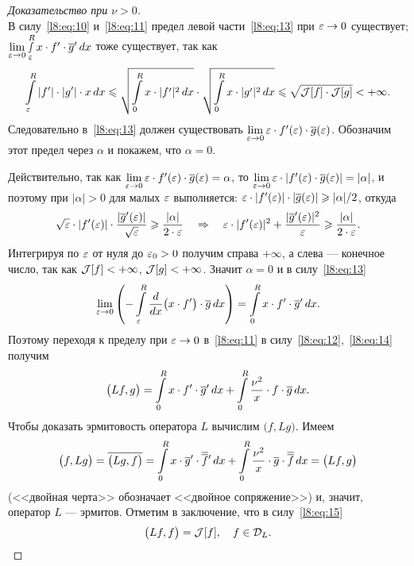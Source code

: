 \begin{proof}[Доказательство при $\nu>0$]
\begin{equation}
	\end{equation}
	В силу~\eqref{l8:eq:10} и~\eqref{l8:eq:11} предел левой части~\eqref{l8:eq:13} при $\varepsilon\to0$ существует; $\lim\limits_{\varepsilon\to0}\smallint\limits_{\varepsilon}^R x\cdot f'\cdot\overline{g}'\,dx$ тоже существует, так как 
	\begin{equation*}
		\hfill\int\limits_{\eps}^{R}|f'|\cdot|g'|\cdot x\,dx\leqslant\sqrt{\int\limits_{0}^{R}x\cdot|f'|^2\,dx}\cdot\sqrt{\int\limits_{0}^{R}x\cdot|g'|^2\,dx}\leqslant\sqrt{\J[f]\cdot\J[g]}<+\infty.\hfill
	\end{equation*}
	Следовательно в~\eqref{l8:eq:13} должен существовать $\lim\limits_{\varepsilon\to0}\varepsilon\cdot f'(\varepsilon)\cdot\overline{g}(\varepsilon)$. Обозначим этот предел через $\alpha$ и покажем, что $\alpha=0$.
	
	Действительно, так как $\lim\limits_{\varepsilon\to0}\varepsilon\cdot f'(\varepsilon)\cdot\overline{g}(\varepsilon)=\alpha$, то $\lim\limits_{\varepsilon\to0}\varepsilon\cdot |f'(\varepsilon)\cdot\overline{g}(\varepsilon)|=|\alpha|$, и поэтому при $|\alpha|>0$ для малых $\varepsilon$ выполняется: $\varepsilon\cdot|f'(\varepsilon)|\cdot|\overline{g}(\varepsilon)|\geqslant|\alpha|/2$, откуда 
	\begin{equation*}
		\hfill\sqrt{\eps}\cdot|f'(\eps)|\cdot\frac{|\overline{g}'(\eps)|}{\sqrt{\eps}}\geqslant\frac{|\alpha|}{2\cdot\eps}\quad\Rightarrow\quad\eps\cdot|f'(\eps)|^2+\frac{|\overline{g}'(\eps)|^2}{\eps}\geqslant\frac{|\alpha|}{2\cdot\eps}.\hfill
	\end{equation*}
	Интегрируя по $\varepsilon$ от нуля до $\varepsilon_0>0$ получим справа $+\infty$, а слева --- конечное число, так как $\mathcal{J}[f]<+\infty$, $\mathcal{J}[g]<+\infty$. Значит $\alpha=0$ и в силу~\eqref{l8:eq:13} 
	\begin{equation}\label{l8:eq:14}
		\hfill\lim\limits_{\eps\to0}\left(-\int\limits_{\eps}^R\der{}{x}\big(x\cdot f'\big)\cdot\overline{g}\,dx\right)=\int\limits_{0}^{R}x\cdot f'\cdot\overline{g}'\,dx.\hfill
	\end{equation}
	Поэтому переходя к пределу при $\varepsilon\to0$ в~\eqref{l8:eq:11} в силу~\eqref{l8:eq:12},~\eqref{l8:eq:14} получим
	\begin{equation}\label{l8:eq:15}
		\hfill\big(Lf,g\big)=\int\limits_0^R x\cdot f'\cdot\overline{g}'\,dx+\int\limits_{0}^{R}\frac{\nu^2}{x}\cdot f\cdot\overline{g}\,dx.\hfill
	\end{equation}
	Чтобы доказать эрмитовость оператора $L$ вычислим $\big(f,Lg\big)$. Имеем
	\begin{equation*}
		\hfill\big(f,Lg\big)=\overline{\big(Lg,f\big)}=\int\limits_0^R x\cdot \overline{g}'\cdot\overline{\overline{f}}\vphantom{f}'\,dx+\int\limits_{0}^{R}\frac{\nu^2}{x}\cdot \overline{g}\cdot\overline{\overline{f}}\,dx=\big(Lf,g\big)\hfill
	\end{equation*}
	(<<двойная черта>> обозначает <<двойное сопряжение>>) и, значит, оператор $L$ --- эрмитов. Отметим в заключение, что в силу~\eqref{l8:eq:15} 
	\begin{equation*}
		\hfill\big(Lf,f\big)=\J[f],\quad f\in\mc{D}_L.\hfill
	\end{equation*} 
\end{proof}

